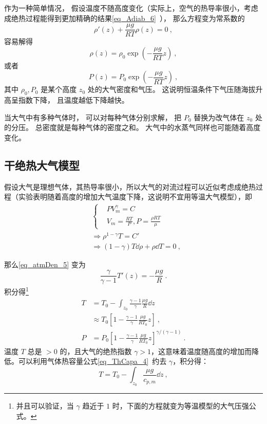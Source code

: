 作为一种简单情况， 假设温度不随高度变化（实际上，空气的热导率很小，考虑成绝热过程能得到更加精确的结果\autoref{eq_Adiab_6}~）， 那么方程变为常系数的
\begin{equation}
\rho'(z)  +  \frac{\mu g}{RT}\rho(z) = 0~,
\end{equation}
容易解得
\begin{equation}\label{eq_atmDen_2}
\rho(z) = \rho_0\exp(-\frac{\mu g}{RT} z)~,
\end{equation}
或者
\begin{equation}\label{eq_atmDen_4}
P(z) = P_0\exp(-\frac{\mu g}{RT} z)~,
\end{equation}
其中 $\rho_0, P_0$ 是某个高度 $z_0$ 处的大气密度和气压。 这说明恒温条件下气压随海拔升高呈指数下降， 且温度越低下降越快。

当大气中有多种气体时， 可以对每种气体分别求解， 把 $P_0$ 替换为改气体在 $z_0$ 处的分压。 总密度就是每种气体的密度之和。 大气中的水蒸气同样也可能随着高度变化。

\subsection{干绝热大气模型}

假设大气是理想气体，其热导率很小，所以大气的对流过程可以近似考虑成绝热过程（实验表明随着高度的增加大气温度下降，这说明不宜用等温大气模型），即
\begin{equation}
\begin{aligned}
&\begin{cases}
&PV_m^\gamma=C\\
&V_m=\frac{RT}{P},P=\frac{\rho R T}{\mu}
\end{cases}
\\
&\Rightarrow \rho^{1-\gamma}T=C'\\
&\Rightarrow (1-\gamma)T\dd \rho+\rho\dd T=0  ~,
\end{aligned}
\end{equation}

那么\autoref{eq_atmDen_5} 变为
\begin{equation}
\frac{\gamma}{\gamma-1}T'(z)=-\frac{\mu g}{R}~.
\end{equation}
积分得\footnote{
并且可以验证，当 $\gamma$ 趋近于 $1$ 时，下面的方程就变为等温模型的大气压强公式。}
\begin{equation}
\begin{aligned}
T&=T_0-\int_{z_0}\frac{\gamma-1}{\gamma}\frac{\mu g}{R} \dd z\\&\approx T_0\left[1-\frac{\gamma-1}{\gamma}\frac{\mu g}{R T_0}z\right]~,\\ 
P&=P_0\left[1-\frac{\gamma-1}{\gamma}\frac{\mu g}{R T_0}z\right]^{\gamma/(\gamma-1)}~.
\end{aligned}
\end{equation}
温度 $T$ 总是 $>0$ 的，且大气的绝热指数 $\gamma>1$，这意味着温度随高度的增加而降低。可以利用气体热容量公式\autoref{eq_ThCapa_4}~约去 $\gamma$，积分得：
\begin{equation}
T=T_0-\int_{z_0}\frac{\mu g}{c_{p,m}} \dd z ~,
\end{equation}

